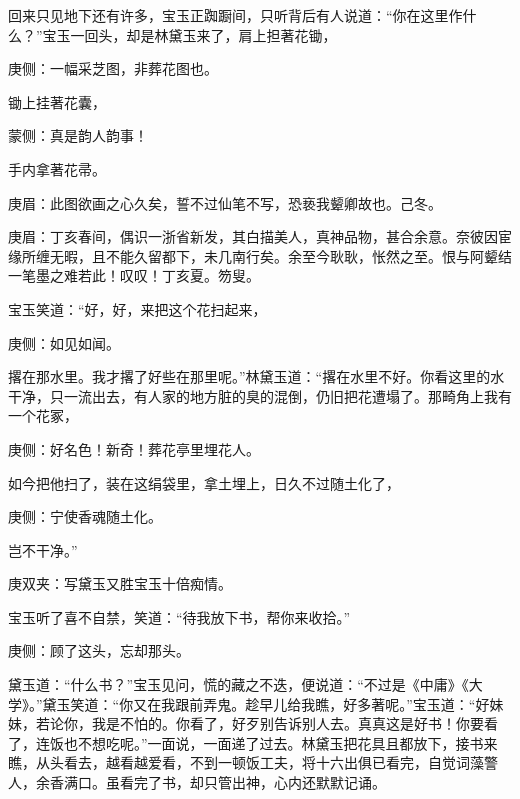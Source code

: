\begin{parag}
    回来只见地下还有许多，宝玉正踟蹰间，只听背后有人说道：“你在这里作什么？”宝玉一回头，却是林黛玉来了，肩上担著花锄，\begin{note}庚侧：一幅采芝图，非葬花图也。\end{note}锄上挂著花囊，\begin{note}蒙侧：真是韵人韵事！\end{note}手内拿著花帚。\begin{note}庚眉：此图欲画之心久矣，誓不过仙笔不写，恐亵我颦卿故也。己冬。\end{note}\begin{note}庚眉：丁亥春间，偶识一浙省新发，其白描美人，真神品物，甚合余意。奈彼因宦缘所缠无暇，且不能久留都下，未几南行矣。余至今耿耿，怅然之至。恨与阿颦结一笔墨之难若此！叹叹！丁亥夏。笏叟。\end{note}宝玉笑道：“好，好，来把这个花扫起来，\begin{note}庚侧：如见如闻。\end{note}撂在那水里。我才撂了好些在那里呢。”林黛玉道：“撂在水里不好。你看这里的水干净，只一流出去，有人家的地方脏的臭的混倒，仍旧把花遭塌了。那畸角上我有一个花冢，\begin{note}庚侧：好名色！新奇！葬花亭里埋花人。\end{note}如今把他扫了，装在这绢袋里，拿土埋上，日久不过随土化了，\begin{note}庚侧：宁使香魂随土化。\end{note}岂不干净。”\begin{note}庚双夹：写黛玉又胜宝玉十倍痴情。\end{note}宝玉听了喜不自禁，笑道：“待我放下书，帮你来收拾。”\begin{note}庚侧：顾了这头，忘却那头。\end{note}黛玉道：“什么书？”宝玉见问，慌的藏之不迭，便说道：“不过是《中庸》《大学》。”黛玉笑道：“你又在我跟前弄鬼。趁早儿给我瞧，好多著呢。”宝玉道：“好妹妹，若论你，我是不怕的。你看了，好歹别告诉别人去。真真这是好书！你要看了，连饭也不想吃呢。”一面说，一面递了过去。林黛玉把花具且都放下，接书来瞧，从头看去，越看越爱看，不到一顿饭工夫，将十六出俱已看完，自觉词藻警人，余香满口。虽看完了书，却只管出神，心内还默默记诵。
\end{parag}


